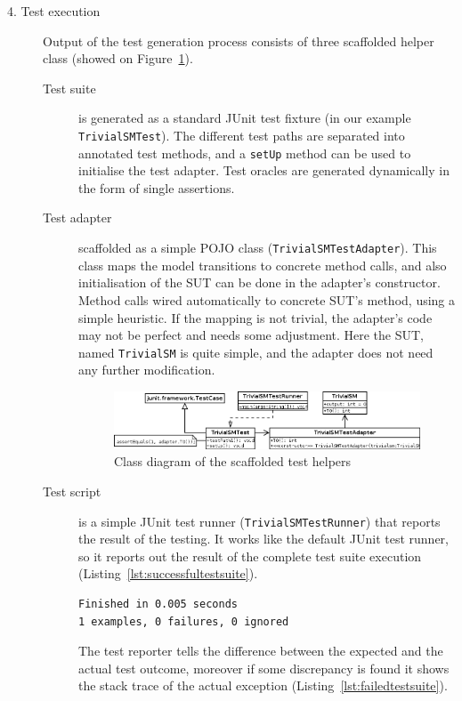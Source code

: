 \begin{description}
	\item[4. Test execution] Output of the test generation process consists of three scaffolded helper class (showed on Figure~\ref{fig:implementation_testhelpers}).
	
\begin{description}
	\item[Test suite] is generated as a standard JUnit test fixture (in our example \texttt{TrivialSMTest}). The different test paths are separated into annotated test methods, and a \texttt{setUp} method can be used to initialise the test adapter. Test oracles are generated dynamically in the form of single assertions.
	\item[Test adapter] scaffolded as a simple POJO class (\texttt{TrivialSMTestAdapter}). This class maps the model transitions to concrete method calls, and also initialisation of the SUT can be done in the adapter's constructor. Method calls wired automatically to concrete SUT's method, using a simple heuristic. If the mapping is not trivial, the adapter's code may not be perfect and needs some adjustment. Here the SUT, named \texttt{TrivialSM} is quite simple, and the adapter does not need any further modification.
	
\begin{figure}[htp]
\centering
\includegraphics[scale=0.4]{figures/implementation_testhelpers}
\caption{Class diagram of the scaffolded test helpers}
\label{fig:implementation_testhelpers}
\end{figure}

	\item[Test script] is a simple JUnit test runner (\texttt{TrivialSMTestRunner}) that reports the result of the testing. It works like the default JUnit test runner, so it reports out the result of the complete test suite execution (Listing~\ref{lst:successfultestsuite}).

\begin{lstlisting}[label={lst:successfultestsuite}, caption=Successful test suite execution output,breaklines=true]
Finished in 0.005 seconds
1 examples, 0 failures, 0 ignored
\end{lstlisting}
	
	The test reporter tells the difference between the expected and the actual test outcome, moreover if some discrepancy is found it shows the stack trace of the actual exception (Listing~\ref{lst:failedtestsuite}).


\end{description}
\end{description}
